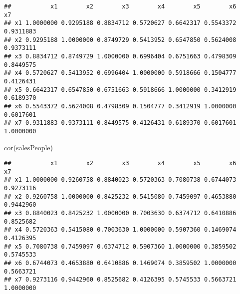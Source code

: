 \documentclass[
]{article}
\newenvironment{Shaded}{\begin{snugshade}}{\end{snugshade}}
\newcommand{\FunctionTok}[1]{\textcolor[rgb]{0.00,0.00,0.00}{#1}}
\newcommand{\NormalTok}[1]{#1}
\newcommand{\SpecialCharTok}[1]{\textcolor[rgb]{0.00,0.00,0.00}{#1}}
\begin{document}
\begin{Shaded}
\end{Shaded}

\begin{verbatim}
##           x1        x2        x3        x4        x5        x6        x7
## x1 1.0000000 0.9295188 0.8834712 0.5720627 0.6642317 0.5543372 0.9311883
## x2 0.9295188 1.0000000 0.8749729 0.5413952 0.6547850 0.5624008 0.9373111
## x3 0.8834712 0.8749729 1.0000000 0.6996404 0.6751663 0.4798309 0.8449575
## x4 0.5720627 0.5413952 0.6996404 1.0000000 0.5918666 0.1504777 0.4126431
## x5 0.6642317 0.6547850 0.6751663 0.5918666 1.0000000 0.3412919 0.6189370
## x6 0.5543372 0.5624008 0.4798309 0.1504777 0.3412919 1.0000000 0.6017601
## x7 0.9311883 0.9373111 0.8449575 0.4126431 0.6189370 0.6017601 1.0000000
\end{verbatim}

\begin{Shaded}
\begin{Highlighting}[]
\FunctionTok{cor}\NormalTok{(salesPeople)}
\end{Highlighting}
\end{Shaded}

\begin{verbatim}
##           x1        x2        x3        x4        x5        x6        x7
## x1 1.0000000 0.9260758 0.8840023 0.5720363 0.7080738 0.6744073 0.9273116
## x2 0.9260758 1.0000000 0.8425232 0.5415080 0.7459097 0.4653880 0.9442960
## x3 0.8840023 0.8425232 1.0000000 0.7003630 0.6374712 0.6410886 0.8525682
## x4 0.5720363 0.5415080 0.7003630 1.0000000 0.5907360 0.1469074 0.4126395
## x5 0.7080738 0.7459097 0.6374712 0.5907360 1.0000000 0.3859502 0.5745533
## x6 0.6744073 0.4653880 0.6410886 0.1469074 0.3859502 1.0000000 0.5663721
## x7 0.9273116 0.9442960 0.8525682 0.4126395 0.5745533 0.5663721 1.0000000
\end{verbatim}
\end{document}
